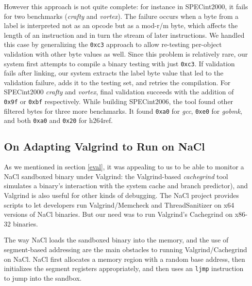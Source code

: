 \documentclass[conference]{IEEEtran}
\begin{document}
However this approach is not quite complete: for instance in SPECint2000, it fails for two benchmarks (\textit{crafty} and \textit{vortex}).
%
The failure occurs when a byte from a label is interpreted not as an opcode but as a mod-r/m byte, which affects the length of an instruction and in turn the stream of later instructions.
%
We handled this case by generalizing the \texttt{0xc3} approach to allow re-testing per-object validation with other byte values as well.
%
Since this problem is relatively rare, our system first attempts to compile a binary testing with just \texttt{0xc3}.
%
If validation fails after linking, our system extracts the label byte value that led to the validation failure, adds it to the testing set, and retries the compilation.
%
For SPECint2000 \textit{crafty} and \textit{vortex}, final validation succeeds with the addition of \texttt{0x9f} or \texttt{0xbf}   respectively.
%
While building SPECint2006, the tool found other filtered bytes for three more benchmarks. It found 
 \texttt{0xa0}  for \textit{gcc}, \texttt{0xe0} for \textit{gobmk},  and both  \texttt{0xa0} and \texttt{0x20} for h264ref. 




\subsection{On Adapting Valgrind  to Run on NaCl}
As we mentioned in section \ref{eval}, it was appealing to us to be able to monitor a NaCl sandboxed binary under Valgrind: the Valgrind-based \textit{cachegrind} tool simulates a binary's interaction with the system cache and branch predictor), and Valgrind is also useful for other kinds of debugging.
The NaCl project provides scripts to let developers  run Valgrind/Memcheck and ThreadSanitizer on x64 versions of NaCl binaries. 
But our need was to run Valgrind's Cachegrind on x86-32 binaries.

The way NaCl loads the sandboxed binary into the memory, and the use of segment-based addressing are the main obstacles to 
running Valgrind/Cachegrind on NaCl. NaCl first allocates a memory region with a random base address, then initializes the 
segment registers appropriately, and then uses an \texttt{ljmp} instruction to jump into the sandbox. 
\end{document}
